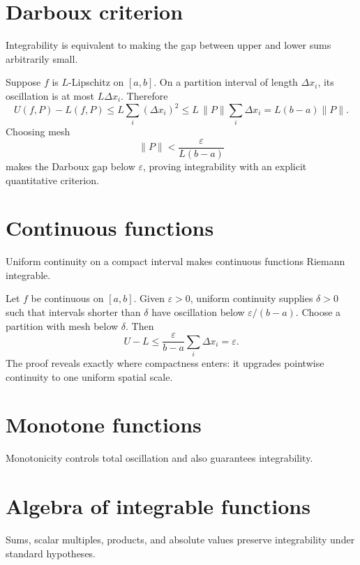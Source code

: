 \section{Darboux criterion}
Integrability is equivalent to making the gap between upper and lower sums arbitrarily small.


\begin{example}\label{ex:ii10-expand-01}
Suppose \(f\) is \(L\)-Lipschitz on \([a,b]\). On a partition interval of
length \(\Delta x_i\), its oscillation is at most \(L\Delta x_i\). Therefore
\[
U(f,P)-L(f,P)
\le L\sum_i(\Delta x_i)^2
\le L\,\|P\|\sum_i\Delta x_i
=L(b-a)\|P\|.
\]
Choosing mesh
\[
\|P\|<\frac{\varepsilon}{L(b-a)}
\]
makes the Darboux gap below \(\varepsilon\), proving integrability with an
explicit quantitative criterion.
\end{example}
\section{Continuous functions}
Uniform continuity on a compact interval makes continuous functions Riemann integrable.


\begin{example}\label{ex:ii10-expand-02}
Let \(f\) be continuous on \([a,b]\). Given \(\varepsilon>0\), uniform
continuity supplies \(\delta>0\) such that intervals shorter than \(\delta\)
have oscillation below \(\varepsilon/(b-a)\). Choose a partition with mesh
below \(\delta\). Then
\[
U-L\le\frac{\varepsilon}{b-a}\sum_i\Delta x_i=\varepsilon.
\]
The proof reveals exactly where compactness enters: it upgrades pointwise
continuity to one uniform spatial scale.
\end{example}
\section{Monotone functions}
Monotonicity controls total oscillation and also guarantees integrability.

\section{Algebra of integrable functions}
Sums, scalar multiples, products, and absolute values preserve integrability under standard hypotheses.

